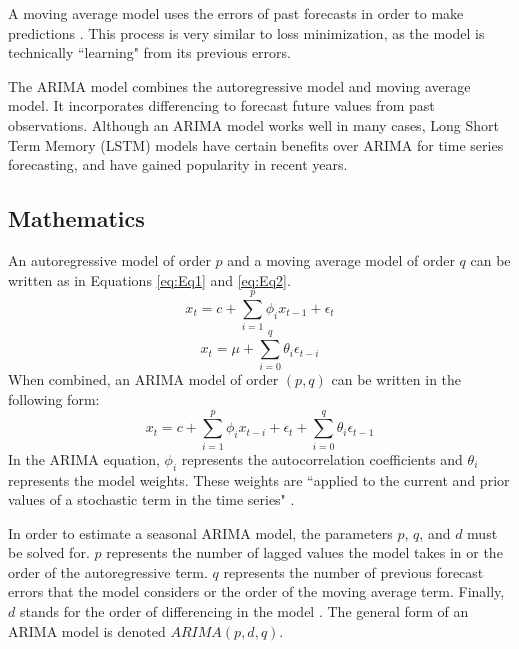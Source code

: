 \documentclass[twoside,11pt]{article}
\begin{document}
A moving average model uses the errors of past forecasts in order to make predictions \citep{binhuraib}. This process is very similar to loss minimization, as the model is technically ``learning" from its previous errors. 

The ARIMA model combines the autoregressive model and moving average model. It incorporates differencing to forecast future values from past observations. Although an ARIMA model works well in many cases, Long Short Term Memory (LSTM) models have certain benefits over ARIMA for time series forecasting, and have gained popularity in recent years.

\subsection{Mathematics}
An autoregressive model of order $p$ and a moving average model of order $q$ can be written as in Equations \eqref{eq:Eq1} and \eqref{eq:Eq2}. 
\begin{equation}\label{eq:Eq1}
    x_t=c+\sum_{i=1}^p\phi_i x_{t-1}+\epsilon_t
\end{equation}
\begin{equation}\label{eq:Eq2}
    x_t=\mu+\sum_{i=0}^q\theta_i\epsilon_{t-i}
\end{equation}
When combined, an ARIMA model of order $(p, q)$ can be written in the following form:
\begin{equation}
    x_t=c+\sum_{i=1}^p \phi_ix_{t-i}+\epsilon_t+\sum_{i=0}^q\theta_i\epsilon_{t-1}
\end{equation}
In the ARIMA equation, $\phi_i$ represents the autocorrelation coefficients and $\theta_i$ represents the model weights. These weights are ``applied to the current and prior values of a stochastic term in the time series" \citep{siami-namini:2018}. 

In order to estimate a seasonal ARIMA model, the parameters $p$, $q$, and $d$ must be solved for. $p$ represents the number of lagged values the model takes in or the order of the autoregressive term. $q$ represents the number of previous forecast errors that the model considers or the order of the moving average term. Finally, $d$ stands for the order of differencing in the model \citep{binhuraib}. The general form of an ARIMA model is denoted $ARIMA(p, d, q)$.
\end{document}
